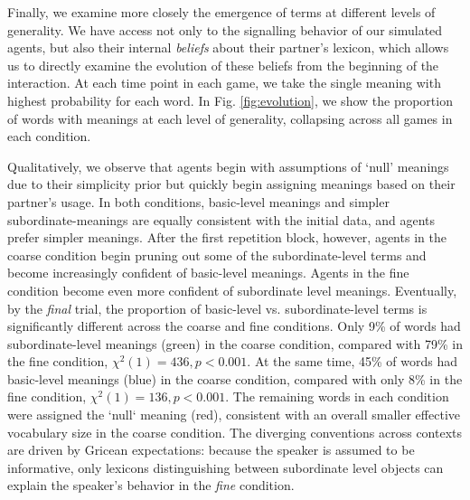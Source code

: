 Finally, we examine more closely the emergence of terms at different levels of generality.
We have access not only to the signalling behavior of our simulated agents, but also their internal \emph{beliefs} about their partner's lexicon, which allows us to directly examine the evolution of these beliefs from the beginning of the interaction.
At each time point in each game, we take the single meaning with highest probability for each word.
In Fig. \ref{fig:evolution}, we show the proportion of words with meanings at each level of generality, collapsing across all games in each condition.

Qualitatively, we observe that agents begin with assumptions of `null' meanings  due to their simplicity prior but quickly begin assigning meanings based on their partner's usage.
In both conditions, basic-level meanings and simpler subordinate-meanings  are equally consistent with the initial data, and agents prefer simpler meanings.
After the first repetition block, however, agents in the coarse condition begin pruning out some of the subordinate-level terms and become increasingly confident of basic-level meanings.
Agents in the fine condition become even more confident of subordinate level meanings.
Eventually, by the \emph{final} trial, the proportion of basic-level vs. subordinate-level terms is significantly different across the coarse and fine conditions.
Only 9\% of words had subordinate-level meanings (green) in the coarse condition, compared with 79\% in the fine condition, $\chi^2(1) = 436, p < 0.001$.
At the same time, 45\% of words had basic-level meanings (blue) in the coarse condition, compared with only 8\% in the fine condition, $\chi^2(1) = 136, p < 0.001$.
The remaining words in each condition were assigned the `null` meaning (red), consistent with an overall smaller effective vocabulary size in the coarse condition.
The diverging conventions across contexts are driven by Gricean expectations: because the speaker is assumed to be informative, only lexicons distinguishing between subordinate level objects can explain the speaker's behavior in the \emph{fine} condition.

